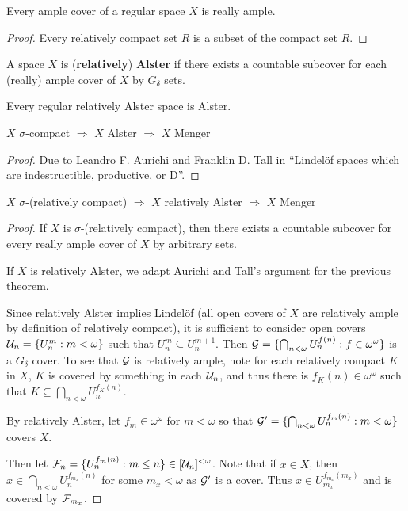   \begin{proposition}
    Every ample cover of a regular space $X$ is really ample.
  \end{proposition}

  \begin{proof}
    Every relatively compact set $R$ is a subset of the compact set $\overline{R}$.
  \end{proof}

  \begin{definition}
    A space $X$ is (\textbf{relatively}) \textbf{Alster} if there exists a countable subcover for each (really) ample cover of $X$ by $G_\delta$ sets.
  \end{definition}

  \begin{proposition}
    Every regular relatively Alster space is Alster.
  \end{proposition}

  \begin{theorem}
    $X$ $\sigma$-compact $\Rightarrow$ $X$ Alster $\Rightarrow$ $X$ Menger
  \end{theorem}

  \begin{proof}
    Due to Leandro F. Aurichi and Franklin D. Tall in ``Lindel\"of spaces which are indestructible, productive, or D''.
  \end{proof}

  \begin{proposition}
    $X$ $\sigma$-(relatively compact) $\Rightarrow$ $X$ relatively Alster $\Rightarrow$ $X$ Menger
  \end{proposition}

  \begin{proof}
    If $X$ is $\sigma$-(relatively compact), then there exists a countable subcover for every really ample cover of $X$ by arbitrary sets.

    If $X$ is relatively Alster, we adapt Aurichi and Tall's argument for the previous theorem.

    Since relatively Alster implies Lindel\"of (all open covers of $X$ are relatively ample by definition of relatively compact), it is sufficient to consider open covers $\mathcal{U}_n = \{ U_n^m : m<\omega\}$ such that $U_n^m\subseteq U_n^{m+1}$. Then $\mathcal{G}=\{\bigcap_{n<\omega} U_n^{f(n)} : f\in \omega^\omega\}$ is a $G_\delta$ cover. To see that $\mathcal{G}$ is relatively ample, note for each relatively compact $K$ in $X$, $K$ is covered by something in each $\mathcal{U}_n$, and thus there is $f_K(n)\in\omega^\omega$ such that $K\subseteq \bigcap_{n<\omega} U_n^{f_K(n)}$.

    By relatively Alster, let $f_m\in\omega^\omega$ for $m<\omega$ so that $\mathcal{G}'=\{\bigcap_{n<\omega} U_n^{f_m(n)}:m<\omega\}$ covers $X$.

    Then let $\mathcal{F}_n = \{U_n^{f_m(n)}:m\leq n\}\in[\mathcal{U}_n]^{<\omega}$. Note that if $x\in X$, then $x\in \bigcap_{n<\omega} U_n^{f_{m_x}(n)}$ for some $m_x<\omega$ as $\mathcal{G}'$ is a cover. Thus $x\in U_{m_x}^{f_{m_x}(m_x)}$ and is covered by $\mathcal{F}_{m_x}$.
  \end{proof}

